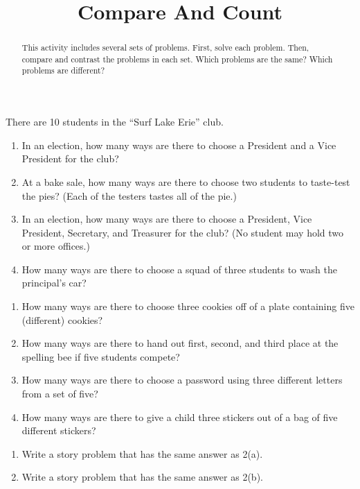 \documentclass[nooutcomes, noauthor]{ximera}
\title{Compare And Count}
\begin{document}
\begin{abstract}
This activity includes several sets of problems.  First, solve each problem.  Then, compare and contrast the problems in each set.  Which problems are the same?  Which problems are different?
\end{abstract}
\maketitle



\begin{problem}
There are 10 students in the ``Surf Lake Erie'' club.
\begin{enumerate}
\item In an election, how many ways are there to choose a President and a Vice President for the club?
\item At a bake sale, how many ways are there to choose two students to taste-test the pies? (Each of the testers tastes all of the pie.)
\item In an election, how many ways are there to choose a President, Vice President, Secretary, and Treasurer for the club?  (No student may hold two or more offices.)
\item How many ways are there to choose a squad of three students to wash the principal's car?

\end{enumerate}
\end{problem}

\begin{problem}
\begin{enumerate}
\item How many ways are there to choose three cookies off of a plate containing five (different) cookies?
\item How many ways are there to hand out first, second, and third place at the spelling bee if five students compete?
\item How many ways are there to choose a password using three different letters from a set of five?
\item How many ways are there to give a child three stickers out of a bag of five different stickers?
\end{enumerate}
\end{problem}


\begin{problem}
\begin{enumerate}
\item Write a story problem that has the same answer as 2(a).
\item Write a story problem that has the same answer as 2(b).
\end{enumerate}
\end{problem}
\end{document}

